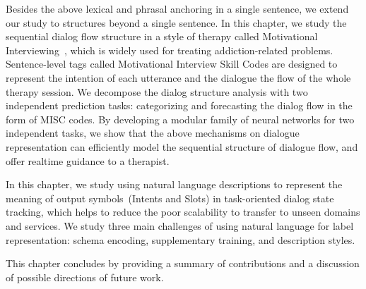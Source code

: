  Besides the above lexical and phrasal anchoring in a
single sentence, we extend our study to structures beyond a single
sentence. In this chapter, we study the sequential dialog flow
structure in a style of therapy called Motivational
Interviewing~\cite[MI,][]{miller2003motivational,miller2012motivational},
which is widely used for treating addiction-related problems.
Sentence-level tags called Motivational Interview Skill Codes are
designed to represent the intention of each utterance and the dialogue
the flow of the whole therapy session. We decompose the dialog structure
analysis with two independent prediction tasks: categorizing and
forecasting the dialog flow in the form of MISC codes. By developing a
modular family of neural networks for two independent tasks, we show
that the above mechanisms on dialogue representation can efficiently
model the sequential structure of dialogue flow, and offer realtime
guidance to a therapist.

 In this
chapter, we study using natural language descriptions to represent the
meaning of output symbols~(Intents and Slots) in task-oriented dialog
state tracking, which helps to reduce the poor scalability to transfer
to unseen domains and services. We study three main challenges of using
natural language for label representation: schema encoding,
supplementary training, and description styles.


 This chapter
concludes by providing a summary of contributions and a discussion of
possible directions of future work.


